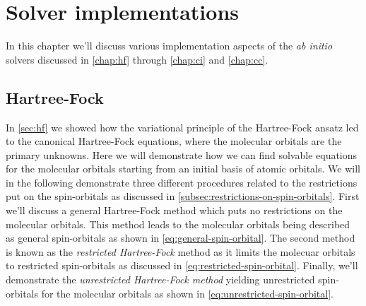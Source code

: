 \chapter{Solver implementations}
    In this chapter we'll discuss various implementation aspects of the \emph{ab
    initio} solvers discussed in \autoref{chap:hf} through \autoref{chap:ci} and
    \autoref{chap:cc}.

    \section{Hartree-Fock}
        In \autoref{sec:hf} we showed how the variational principle of the
        Hartree-Fock ansatz led to the canonical Hartree-Fock equations, where
        the molecular orbitals are the primary unknowns.
        Here we will demonstrate how we can find solvable equations for the
        molecular orbitals starting from an initial basis of atomic orbitals.
        We will in the following demonstrate three different procedures related
        to the restrictions put on the spin-orbitals as discussed in
        \autoref{subsec:restrictions-on-spin-orbitals}.
        First we'll discuss a general Hartree-Fock method which puts no
        restrictions on the molecular orbitals.
        This method leads to the molecular orbitals being described as general
        spin-orbitals as shown in \autoref{eq:general-spin-orbital}.
        The second method is known as the \emph{restricted Hartree-Fock} method
        as it limits the molecuar orbitals to restricted spin-orbitals as
        discussed in \autoref{eq:restricted-spin-orbital}.
        Finally, we'll demonstrate the \emph{unrestricted Hartree-Fock method}
        yielding unrestricted spin-orbitals for the molecular orbitals as
        shown in \autoref{eq:unrestricted-spin-orbital}.

